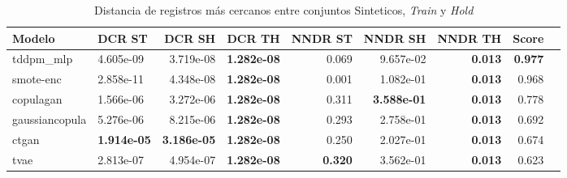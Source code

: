 \begin{table}[H]
\centering
\caption{Distancia de registros más cercanos entre conjuntos Sinteticos, \emph{Train} y \emph{Hold}}
\label{table-dcr-economicos-a-1}
\begin{tabular}{|l|l|r|r|r|r|r|r|r|}
\hline
\rowcolor[gray]{0.8}
Modelo & DCR ST & DCR SH & DCR TH & NNDR ST & NNDR SH & NNDR TH & \textbf{Score} \\
\hline tddpm\_mlp & 4.605e-09 & \cellcolor[rgb]{0.9, 0.54, 0.52} 3.719e-08 & \bfseries 1.282e-08 & 0.069 & 9.657e-02 & \bfseries 0.013 & \bfseries 0.977 \\
\hline smote-enc & \cellcolor[rgb]{0.9, 0.54, 0.52} 2.858e-11 & 4.348e-08 & \bfseries 1.282e-08 & 0.001 & 1.082e-01 & \bfseries 0.013 & 0.968 \\
\hline copulagan & 1.566e-06 & 3.272e-06 & \bfseries 1.282e-08 & 0.311 & \bfseries 3.588e-01 & \bfseries 0.013 & 0.778 \\
\hline gaussiancopula & 5.276e-06 & 8.215e-06 & \bfseries 1.282e-08 & 0.293 & 2.758e-01 & \bfseries 0.013 & 0.692 \\
\hline ctgan & \bfseries 1.914e-05 & \bfseries 3.186e-05 & \bfseries 1.282e-08 & 0.250 & 2.027e-01 & \bfseries 0.013 & 0.674 \\
\hline tvae & 2.813e-07 & 4.954e-07 & \bfseries 1.282e-08 & \bfseries 0.320 & 3.562e-01 & \bfseries 0.013 & 0.623 \\
\hline
\end{tabular}
\end{table}
